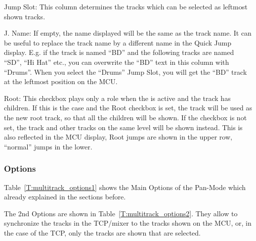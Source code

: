 \begin{compactitem}
\item Jump Slot: This column determines the tracks which can be
  selected as leftmost shown tracks.
\item J. Name: If empty, the name displayed will be the same as the
  track name. It can be useful to replace the track name by a
  different name in the Quick Jump display.  E.g. if the track is
  named ``BD'' and the following tracks are named ``SD'', ``Hi Hat''
  etc., you can overwrite the ``BD'' text in this column with
  ``Drums''. When you select the ``Drums'' Jump Slot, you will get the
  ``BD'' track at the leftmost position on the MCU. 
\item Root: This checkbox plays only a role when the \foldermode is
  active and the track has children. If this is the case and the Root
  checkbox is set, the track will be used as the new root track, so
  that all the children will be shown. If the checkbox is not set, the
  track and other tracks on the same level will be shown instead. This
  is also reflected in the MCU display, Root jumps are shown in the
  upper row, ``normal'' jumps in the lower.
\end{compactitem}

\subsubsection{Options}\label{panOptions}
Table~\ref{T:multitrack_options1} shows the Main Options of the Pan-Mode which
already explained in the sections before.


The 2nd Options are shown in Table~\ref{T:multitrack_options2}. They allow to
synchronize the tracks in the TCP/mixer to the tracks shown on the MCU, or, in
the case of the TCP, only the tracks are shown that are selected.



